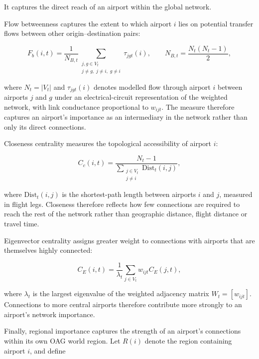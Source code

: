 \documentclass[12pt]{extarticle}
\begin{document}
It captures the direct reach of an airport within the global network.

Flow betweenness captures the extent to which airport $i$ lies on potential transfer flows between other origin--destination pairs:

\begin{equation}
F_b(i,t)
=
\frac{1}{N_{B,t}}
\sum_{\substack{j,g\in V_t\\
j\neq g,\; j\neq i,\; g\neq i}}
\tau_{jgt}(i),
\qquad
N_{B,t}
=
\frac{N_t(N_t-1)}{2},
\label{eq:nature_12}
\end{equation}

where $N_t=|V_t|$ and $\tau_{jgt}(i)$ denotes modelled flow through airport $i$ between airports $j$ and $g$ under an electrical-circuit representation of the weighted network, with link conductance proportional to $w_{ijt}$. The measure therefore captures an airport's importance as an intermediary in the network rather than only its direct connections.

Closeness centrality measures the topological accessibility of airport $i$:

\begin{equation}
C_c(i,t)
=
\frac{N_t-1}
{\displaystyle
\sum_{\substack{j\in V_t\\j\neq i}}
\mathrm{Dist}_t(i,j)
},
\label{eq:nature_13}
\end{equation}

where $\mathrm{Dist}_t(i,j)$ is the shortest-path length between airports $i$ and $j$, measured in flight legs. Closeness therefore reflects how few connections are required to reach the rest of the network rather than geographic distance, flight distance or travel time.

Eigenvector centrality assigns greater weight to connections with airports that are themselves highly connected:

\begin{equation}
C_E(i,t)
=
\frac{1}{\lambda_t}
\sum_{j\in V_t}
w_{ijt} C_E(j,t),
\label{eq:nature_14}
\end{equation}

where $\lambda_t$ is the largest eigenvalue of the weighted adjacency matrix $W_t=[w_{ijt}]$. Connections to more central airports therefore contribute more strongly to an airport's network importance.

Finally, regional importance captures the strength of an airport's connections within its own OAG world region. Let $R(i)$ denote the region containing airport $i$, and define
\end{document}
